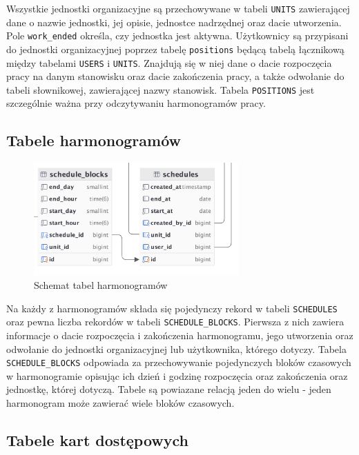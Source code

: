 Wszystkie jednostki organizacyjne są przechowywane w tabeli \texttt{UNITS} zawierającej dane o nazwie jednostki, jej opisie, jednostce nadrzędnej oraz dacie utworzenia. Pole \texttt{work\_ended} określa, czy jednostka jest aktywna. Użytkownicy są przypisani do jednostki organizacyjnej poprzez tabelę \texttt{positions} będącą tabelą łącznikową między tabelami \texttt{USERS} i \texttt{UNITS}. Znajdują się w niej dane o dacie rozpoczęcia pracy na danym stanowisku oraz dacie zakończenia pracy, a także odwołanie do tabeli słownikowej, zawierającej nazwy stanowisk. Tabela \texttt{POSITIONS} jest szczególnie ważna przy odczytywaniu harmonogramów pracy.

\subsection{Tabele harmonogramów}

\begin{figure}[H]
    \centering
    \includegraphics[width=0.7\textwidth]{graf/scheduleTable.png}
    \caption{Schemat tabel harmonogramów}
    \label{fig:schedulesTable}
\end{figure}

Na każdy z harmonogramów składa się pojedynczy rekord w tabeli \texttt{SCHEDULES} oraz pewna liczba rekordów w tabeli \texttt{SCHEDULE\_BLOCKS}. Pierwsza z nich zawiera informacje o dacie rozpoczęcia i zakończenia harmonogramu, jego utworzenia oraz odwołanie do jednostki organizacyjnej lub użytkownika, którego dotyczy. Tabela \texttt{SCHEDULE\_BLOCKS} odpowiada za przechowywanie pojedynczych bloków czasowych w harmonogramie opisując ich dzień i godzinę rozpoczęcia oraz zakończenia oraz jednostkę, której dotyczą. Tabele są powiazane relacją jeden do wielu - jeden harmonogram może zawierać wiele bloków czasowych.

\subsection{Tabele kart dostępowych}

